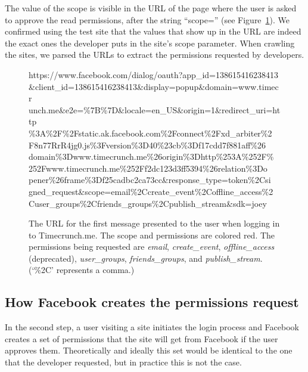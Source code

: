 \documentclass[10pt]{sig-alternate-10pt}
\begin{document}
The value of the scope is visible in the URL of the page where the user is asked to approve the read permissions, after the string ``scope='' (see Figure~\ref{figure:scopeinurl}). We confirmed using the test site that the values that show up in the URL are indeed the exact ones the developer puts in the site's scope parameter. When crawling the sites, we parsed the URLs to extract the permissions requested by developers.

\begin{figure}[h!]
  {\small{\selectfont https://www.facebook.com/dialog/oauth?app\_id=138615416238413\\\&client\_id=138615416238413\&display=popup\&domain=www.timecr\\unch.me\&e2e=\%7B\%7D\&locale=en\_US\&origin=1\&redirect\_uri=http\\\%3A\%2F\%2Fstatic.ak.facebook.com\%2Fconnect\%2Fxd\_arbiter\%2\\F8n77RrR4jg0.js\%3Fversion\%3D40\%23cb\%3Df17cdd7f881aff\%26\\domain\%3Dwww.timecrunch.me\%26origin\%3Dhttp\%253A\%252F\%\\252Fwww.timecrunch.me\%252Ff2dc123d3ff5394\%26relation\%3Do\\pener\%26frame\%3Df25cadbc2ca73cc\&response\_type=token\%2Csi\\gned\_request\&{\color{darkred}scope=email\%2Ccreate\_event\%2Coffline\_access\%2\\Cuser\_groups\%2Cfriends\_groups\%2Cpublish\_stream}\&sdk=joey}}
  \caption{The URL for the first message presented to the user when logging in to Timecrunch.me. The scope and permissions are colored red. The permissions being requested are \emph{email}, \emph{create\_event}, \emph{offline\_access} (deprecated), \emph{user\_groups}, \emph{friends\_groups}, and \emph{publish\_stream}. (`\%2C' represents a comma.)}
  \label{figure:scopeinurl}
\end{figure}
\subsection{How Facebook creates the permissions request}

In the second step, a user visiting a site initiates the login process and Facebook creates a set of permissions that the site will get from Facebook if the user approves them. Theoretically and ideally this set would be identical to the one that the developer requested, but in practice this is not the case.
\end{document}

